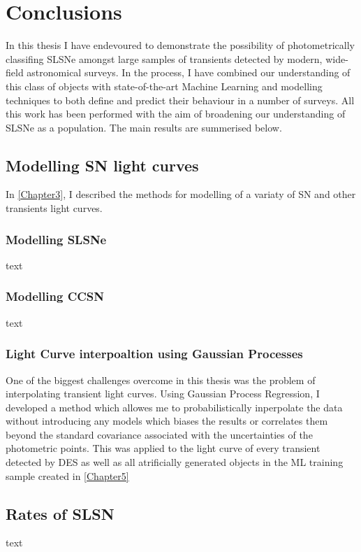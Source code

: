 \chapter{Conclusions}
\label{Chapter7}

In this thesis I have endevoured to demonstrate the possibility of photometrically classifing SLSNe amongst large samples of transients detected by modern, wide-field astronomical surveys. In the process, I have combined our understanding of this class of objects with state-of-the-art Machine Learning and modelling techniques to both define and predict their behaviour in a number of surveys. All this work has been performed with the aim of broadening our understanding of SLSNe as a population. The main results are summerised below.

\section{Modelling SN light curves}
In \cref{Chapter3}, I described the methods for modelling of a variaty of SN and other transients light curves.

\subsection{Modelling SLSNe}
text

\subsection{Modelling CCSN}
text

\subsection{Light Curve interpoaltion using Gaussian Processes}
One of the biggest challenges overcome in this thesis was the problem of interpolating transient light curves. Using Gaussian Process Regression, I developed a method which allowes me to probabilistically inperpolate the data without introducing any models which biases the results or correlates them beyond the standard covariance associated with the uncertainties of the photometric points. This was applied to the light curve of every transient detected by DES as well as all atrificially generated objects in the ML training sample created in \cref{Chapter5}

\section{Rates of SLSN}
text

